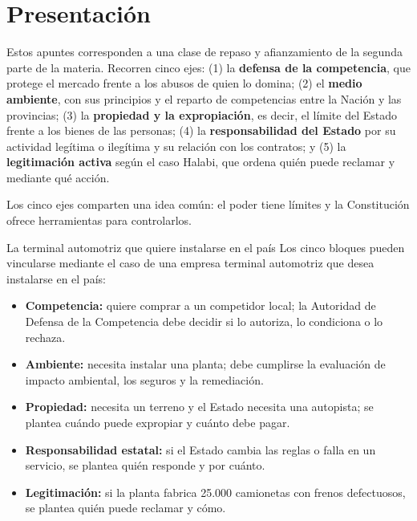 \documentclass[12pt,oneside]{book}
\begin{document}
\tableofcontents

\chapter*{Presentación}

Estos apuntes corresponden a una clase de repaso y afianzamiento de la segunda parte de la materia. Recorren cinco ejes: (1) la \textbf{defensa de la competencia}, que protege el mercado frente a los abusos de quien lo domina; (2) el \textbf{medio ambiente}, con sus principios y el reparto de competencias entre la Nación y las provincias; (3) la \textbf{propiedad y la expropiación}, es decir, el límite del Estado frente a los bienes de las personas; (4) la \textbf{responsabilidad del Estado} por su actividad legítima o ilegítima y su relación con los contratos; y (5) la \textbf{legitimación activa} según el caso Halabi, que ordena quién puede reclamar y mediante qué acción.

Los cinco ejes comparten una idea común: el poder tiene límites y la Constitución ofrece herramientas para controlarlos.

\begin{example}{La terminal automotriz que quiere instalarse en el país}
Los cinco bloques pueden vincularse mediante el caso de una empresa terminal automotriz que desea instalarse en el país:
\begin{itemize}
    \item \textbf{Competencia:} quiere comprar a un competidor local; la Autoridad de Defensa de la Competencia debe decidir si lo autoriza, lo condiciona o lo rechaza.
    \item \textbf{Ambiente:} necesita instalar una planta; debe cumplirse la evaluación de impacto ambiental, los seguros y la remediación.
    \item \textbf{Propiedad:} necesita un terreno y el Estado necesita una autopista; se plantea cuándo puede expropiar y cuánto debe pagar.
    \item \textbf{Responsabilidad estatal:} si el Estado cambia las reglas o falla en un servicio, se plantea quién responde y por cuánto.
    \item \textbf{Legitimación:} si la planta fabrica 25.000 camionetas con frenos defectuosos, se plantea quién puede reclamar y cómo.
\end{itemize}
\end{example}
\end{document}
